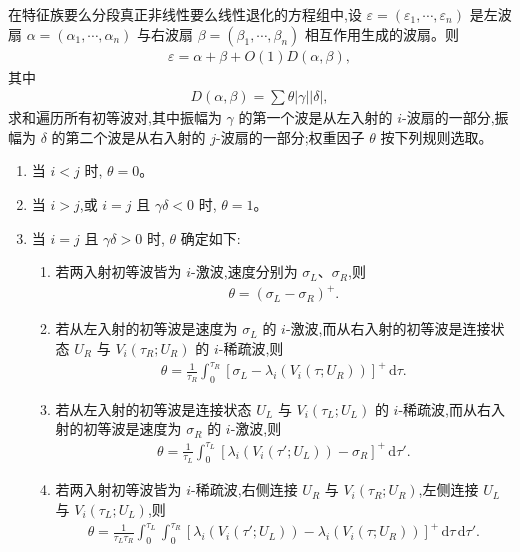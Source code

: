 \documentclass[../../main.tex]{subfiles}
\begin{document}
\begin{theorem}\label{theorem:ch09-分段非线性波扇相互作用}
在特征族要么分段真正非线性要么线性退化的方程组中,设 $\varepsilon=(\varepsilon_{1},\cdots ,\varepsilon_{n})$ 是左波扇 $\alpha=(\alpha_{1},\cdots ,\alpha_{n})$ 与右波扇 $\beta=(\beta_{1},\cdots ,\beta_{n})$ 相互作用生成的波扇。则
\begin{align}
\varepsilon=\alpha+\beta+O(1)D(\alpha,\beta),
\label{align:ch09-9-9-14}
\end{align}
其中
\begin{align}
D(\alpha,\beta)=\sum\theta|\gamma||\delta|,
\label{align:ch09-9-9-15}
\end{align}
求和遍历所有初等波对,其中振幅为 $\gamma$ 的第一个波是从左入射的 $i$-波扇的一部分,振幅为 $\delta$ 的第二个波是从右入射的 $j$-波扇的一部分;权重因子 $\theta$ 按下列规则选取。
\begin{enumerate}
\item 当 $i<j$ 时, $\theta=0$。
\item 当 $i>j$,或 $i=j$ 且 $\gamma\delta<0$ 时, $\theta=1$。
\item 当 $i=j$ 且 $\gamma\delta>0$ 时, $\theta$ 确定如下:
\begin{enumerate}
\item 若两入射初等波皆为 $i$-激波,速度分别为 $\sigma_{L}$、$\sigma_{R}$,则
\begin{align}
\theta=(\sigma_{L}-\sigma_{R})^{+}.
\label{align:ch09-9-9-16a}
\end{align}
\item 若从左入射的初等波是速度为 $\sigma_{L}$ 的 $i$-激波,而从右入射的初等波是连接状态 $U_{R}$ 与 $V_{i}(\tau_{R};U_{R})$ 的 $i$-稀疏波,则
\begin{align}
\theta=\frac{1}{\tau_{R}}\int_{0}^{\tau_{R}}[\sigma_{L}-\lambda_{i}(V_{i}(\tau;U_{R}))]^{+}\,\mathrm{d}\tau.
\label{align:ch09-9-9-16b}
\end{align}
\item 若从左入射的初等波是连接状态 $U_{L}$ 与 $V_{i}(\tau_{L};U_{L})$ 的 $i$-稀疏波,而从右入射的初等波是速度为 $\sigma_{R}$ 的 $i$-激波,则
\begin{align}
\theta=\frac{1}{\tau_{L}}\int_{0}^{\tau_{L}}[\lambda_{i}(V_{i}(\tau';U_{L}))-\sigma_{R}]^{+}\,\mathrm{d}\tau'.
\label{align:ch09-9-9-16c}
\end{align}
\item 若两入射初等波皆为 $i$-稀疏波,右侧连接 $U_{R}$ 与 $V_{i}(\tau_{R};U_{R})$,左侧连接 $U_{L}$ 与 $V_{i}(\tau_{L};U_{L})$,则
\begin{align}
\theta=\frac{1}{\tau_{L}\tau_{R}}\int_{0}^{\tau_{L}}\int_{0}^{\tau_{R}}[\lambda_{i}(V_{i}(\tau';U_{L}))-\lambda_{i}(V_{i}(\tau;U_{R}))]^{+}\,\mathrm{d}\tau\,\mathrm{d}\tau'.
\label{align:ch09-9-9-16d}
\end{align}
\end{enumerate}
\end{enumerate}
\end{theorem}
\end{document}
